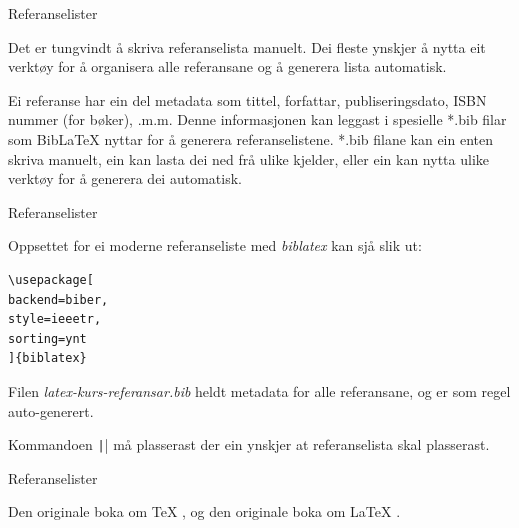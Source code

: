 \begin{frame}[containsverbatim]{Referanselister}
	
	Det er tungvindt å skriva referanselista manuelt. Dei fleste ynskjer å nytta eit verktøy for å organisera alle referansane og å generera lista automatisk.
	
	Ei referanse har ein del metadata som tittel, forfattar, publiseringsdato, ISBN nummer (for bøker), .m.m. Denne informasjonen kan leggast i spesielle *.bib filar som BibLaTeX nyttar for å generera referanselistene. *.bib filane kan ein enten skriva manuelt, ein kan lasta dei ned frå ulike kjelder, eller ein kan nytta ulike verktøy for å generera dei automatisk.	

\end{frame}


\begin{frame}[containsverbatim]{Referanselister}
	
	Oppsettet for ei moderne referanseliste med \textit{biblatex} kan sjå slik ut:
	
	\begin{verbatim}
\usepackage[
backend=biber,
style=ieeetr,
sorting=ynt
]{biblatex}

	\end{verbatim}
	
	Filen \textit{latex-kurs-referansar.bib} heldt metadata for alle referansane, og er som regel auto-generert.

Kommandoen \texttt|\printbibliography| må plasserast der ein ynskjer at referanselista skal plasserast.

\end{frame}


\begin{frame}[containsverbatim]{Referanselister}

Den originale boka om \TeX{} \cite{knuth1986texbook}, og den originale boka om \LaTeX{} \cite{lamport1994latex}.

\printbibliography

\end{frame}


